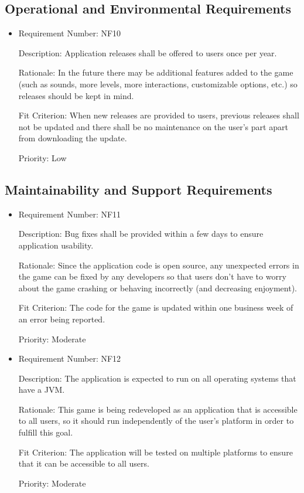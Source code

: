 \documentclass[12pt, titlepage]{article}
\begin{document}
\subsection{Operational and Environmental Requirements}
\begin{itemize}
	\item
	Requirement Number: NF10

	Description: Application releases shall be offered to users once per year.

	Rationale: In the future there may be additional features added to the game (such as sounds, more levels, more interactions, customizable options, etc.) so releases should be kept in mind.

	Fit Criterion: When new releases are provided to users, previous releases shall not be updated and there shall be no maintenance on the user's part apart from downloading the update.

	Priority: Low

\end{itemize}

\subsection{Maintainability and Support Requirements}
\begin{itemize}
	\item
	Requirement Number: NF11

	Description: Bug fixes shall be provided within a few days to ensure application usability.

	Rationale: Since the application code is open source, any unexpected errors in the game can be fixed by any developers so that users don't have to worry about the game crashing or behaving incorrectly (and decreasing enjoyment).

	Fit Criterion: The code for the game is updated within one business week of an error being reported.

	Priority: Moderate

	\item
	Requirement Number: NF12

	Description: The application is expected to run on all operating systems that have a JVM.

	Rationale: This game is being redeveloped as an application that is accessible to all users, so it should run independently of the user's platform in order to fulfill this goal.

	Fit Criterion: The application will be tested on multiple platforms to ensure that it can be accessible to all users.

	Priority: Moderate
\end{itemize}
\end{document}
